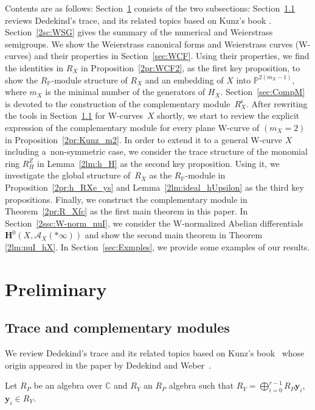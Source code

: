 \documentclass[10pt,a4paper]{amsart}
\def\CC{{\mathbb C}}
\def\PP{{\mathbb P}}
\def\bH{{\mathbf F}}
\def\bH{{\mathbf H}}
\def\bby{{\mathbf y}}
\def\cA{{\mathcal A}}
\def\fc{{\mathfrak c}}
\numberwithin{equation}{section}
\begin{document}
Contents are as follows:
Section~\ref{sec:preliminary} consists of the two subsections:
Section~\ref{2sc:App_trace} reviews Dedekind's trace, and its related topics based on Kunz's book \cite{Kunz2004}.
Section~\ref{2sc:WSG} gives the summary of the numerical and Weierstrass semigroups.
We show the Weierstrass canonical forms and Weierstrass curves (W-curves) and their properties in Section~\ref{sec:WCF}.
Using their properties, we find the identities in $R_X$ in Proposition~\ref{2pr:WCF2}, as the first key proposition, to show the $R_\PP$-module structure of $R_X$ and an embedding of $X$ into $\PP^{2(m_X-1)}$, where $m_X$ is the minimal number of the generators of $H_X$.
Section~\ref{sec:CompM} is devoted to the construction of the complementary module~$R_X^\fc$.
After rewriting the tools in Section~\ref{2sc:App_trace} for W-curves~$X$ shortly, we start to review the explicit expression of the complementary module for every plane W-curve of $(m_X=2)$ \cite[Theorem~15.1]{Kunz2004} in Proposition~\ref{2pr:Kunz_m2}.
In order to extend it to a general W-curve $X$ including a~non-symmetric case, we consider the trace structure of the monomial ring $R_H^Z$ in Lemma~\ref{2lm:h_H} as the second key proposition.
Using it, we investigate the global structure of~$R_X$ as the $R_\PP$-module in Proposition~\ref{2pr:h_RXe_ys} and Lemma~\ref{2lm:ideal_hUpsilon} as the third key propositions.
Finally, we construct the complementary module in Theorem~\ref{2pr:R_Xfc} as the first main theorem in this paper.
In Section~\ref{2ssc:W-norm_nuI}, we consider the W-normalized Abelian differentials $\bH^0(X, \cA_X(*\infty))$ and show the second main theorem in Theorem \ref{2lm:nuI_hX}.
In Section~\ref{sec:Exmples}, we provide some examples of our results.

\section{Preliminary}\label{sec:preliminary}

\subsection{Trace and complementary modules}\label{2sc:App_trace}

We review Dedekind's trace and its related topics based on Kunz's book~\cite{Kunz2004} whose origin appeared in the paper by Dedekind and Weber~\cite{DedekindWeber}.

Let $R_P$ be an algebra over $\CC$ and $R_Y$ an $R_P$ algebra such that
$R_Y=\bigoplus_{i=0}^{r-1}R_P\bby_i$, $\bby_i\in R_Y$.
\end{document}
